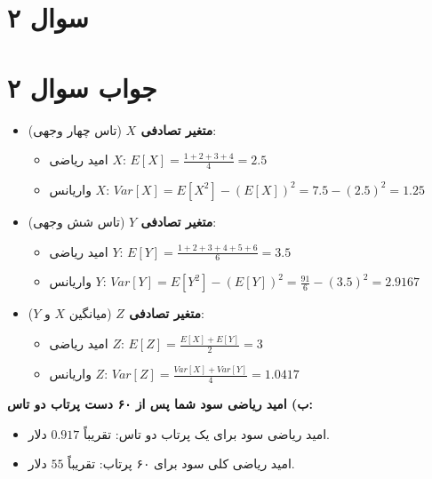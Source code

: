 \section*{سوال ۲}



\section*{جواب سوال ۲}

\begin{itemize}
	\item \textbf{متغیر تصادفی \(X\)} (تاس چهار وجهی):
	\begin{itemize}
		\item امید ریاضی \(X\): \(E[X] = \frac{1 + 2 + 3 + 4}{4} = 2.5\)
		\item واریانس \(X\): \(Var[X] = E[X^2] - (E[X])^2 = 7.5 - (2.5)^2 = 1.25\)
	\end{itemize}
	\item \textbf{متغیر تصادفی \(Y\)} (تاس شش وجهی):
	\begin{itemize}
		\item امید ریاضی \(Y\): \(E[Y] = \frac{1 + 2 + 3 + 4 + 5 + 6}{6} = 3.5\)
		\item واریانس \(Y\): \(Var[Y] = E[Y^2] - (E[Y])^2 = \frac{91}{6} - (3.5)^2 = 2.9167\)
	\end{itemize}
	\item \textbf{متغیر تصادفی \(Z\)} (میانگین \(X\) و \(Y\)):
	\begin{itemize}
		\item امید ریاضی \(Z\): \(E[Z] = \frac{E[X] + E[Y]}{2} = 3\)
		\item واریانس \(Z\): \(Var[Z] = \frac{Var[X] + Var[Y]}{4} = 1.0417\)
	\end{itemize}
\end{itemize}

\textbf{ب) امید ریاضی سود شما پس از ۶۰ دست پرتاب دو تاس:}
\begin{itemize}
	\item امید ریاضی سود برای یک پرتاب دو تاس: تقریباً \(0.917\) دلار.
	\item امید ریاضی کلی سود برای ۶۰ پرتاب: تقریباً \(55\) دلار.
\end{itemize}